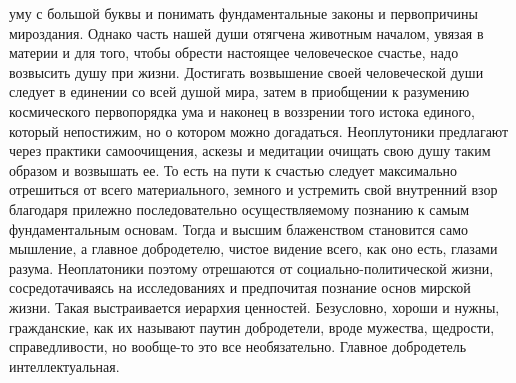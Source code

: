 уму с большой буквы и понимать фундаментальные законы и первопричины мироздания.
Однако часть нашей души отягчена животным началом, увязая в материи и для того,
чтобы обрести настоящее человеческое счастье, надо возвысить душу при жизни.
Достигать возвышение своей человеческой души следует в единении со всей душой
мира, затем в приобщении к разумению космического первопорядка ума и наконец в
воззрении того истока единого, который непостижим, но о котором можно
догадаться. Неоплутоники предлагают через практики самоочищения, аскезы и
медитации очищать свою душу таким образом и возвышать ее. То есть на пути к
счастью следует максимально отрешиться от всего материального, земного и
устремить свой внутренний взор благодаря прилежно последовательно
осуществляемому познанию к самым фундаментальным основам. Тогда и высшим
блаженством становится само мышление, а главное добродетелю, чистое видение
всего, как оно есть, глазами разума. Неоплатоники поэтому отрешаются от
социально-политической жизни, сосредотачиваясь на исследованиях и предпочитая
познание основ мирской жизни. Такая выстраивается иерархия ценностей.
Безусловно, хороши и нужны, гражданские, как их называют паутин добродетели,
вроде мужества, щедрости, справедливости, но вообще-то это все необязательно.
Главное добродетель интеллектуальная.
